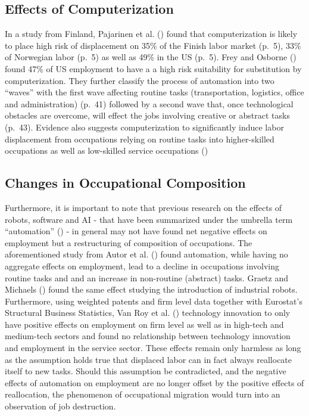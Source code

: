 \documentclass[
  12pt,
  a4paperpaper,
]{article}
\begin{document}
\subsection{Effects of
Computerization}\label{sec-effects-of-computerization}

In a study from Finland, Pajarinen et al.
() found that
computerization is likely to place high risk of displacement on 35\% of
the Finish labor market (p.~5), 33\% of Norwegian labor (p.~5) as well
as 49\% in the US (p.~5). Frey and Osborne
() found 47\% of US
employment to have a a high risk suitability for substitution by
computerization. They further classify the process of automation into
two ``waves'' with the first wave affecting routine tasks
(transportation, logistics, office and administration) (p.~41) followed
by a second wave that, once technological obstacles are overcome, will
effect the jobs involving creative or abstract tasks (p.~43). Evidence
also suggests computerization to significantly induce labor displacement
from occupations relying on routine tasks into higher-skilled
occupations as well as low-skilled service occupations
()

\subsection{Changes in Occupational
Composition}\label{sec-changes-of-occupational-composition}

Furthermore, it is important to note that previous research on the
effects of robots, software and AI - that have been summarized under the
umbrella term ``automation'' () - in general may not have found net negative
effects on employment but a restructuring of composition of occupations.
The aforementioned study from Autor et al.
() found automation,
while having no aggregate effects on employment, lead to a decline in
occupations involving routine tasks and and an increase in non-routine
(abstract) tasks. Graetz and Michaels
() found the same effect
studying the introduction of industrial robots. Furthermore, using
weighted patents and firm level data together with Eurostat's Structural
Business Statistics, Van Roy et al.
() technology
innovation to only have positive effects on employment on firm level as
well as in high-tech and medium-tech sectors and found no relationship
between technology innovation and employment in the service sector.
These effects remain only harmless as long as the assumption holds true
that displaced labor can in fact always reallocate itself to new tasks.
Should this assumption be contradicted, and the negative effects of
automation on employment are no longer offset by the positive effects of
reallocation, the phenomenon of occupational migration would turn into
an observation of job destruction.
\end{document}
